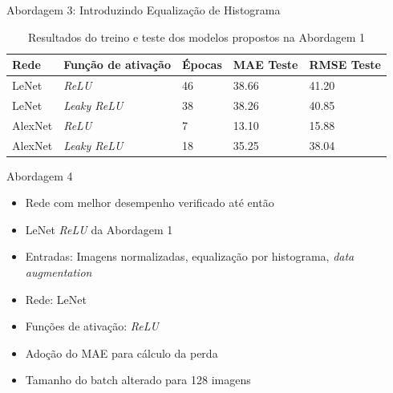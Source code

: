 \begin{frame}{\large{Abordagem 3: Introduzindo Equalização de Histograma}}
  \begin{table}[!ht]
		\caption{Resultados do treino e teste dos modelos propostos na Abordagem 1}
		\label{tab:results-1}
		\begin{center}
			\begin{tabular}{l l l l l}
				\toprule
				Rede & Função de ativação & Épocas & MAE Teste & RMSE Teste \\
				\midrule
        LeNet & \emph{ReLU} & 46 &  38.66 & 41.20 \\
				LeNet & \emph{Leaky ReLU} &  38 & 38.26 & 40.85 \\
				AlexNet & \emph{ReLU} & 7 & 13.10 & 15.88 \\
				AlexNet & \emph{Leaky ReLU} & 18 & 35.25 & 38.04 \\
				\bottomrule
			\end{tabular}
		\end{center}
	\end{table}
\end{frame}



\begin{frame}{\large{Abordagem 4}}
 \begin{itemize}
   \item Rede com melhor desempenho verificado até então
   \item  \alert{LeNet \emph{ReLU} da Abordagem 1}
   \ \ \newline
   \item Entradas: Imagens normalizadas, equalização por histograma, \emph{data augmentation}
   \item Rede: LeNet
   \item Funções de ativação: \emph{ReLU}
   \ \ \newline
   \item Adoção do MAE para cálculo da perda
   \item Tamanho do batch alterado para 128 imagens
   \end{itemize}
\end{frame}


